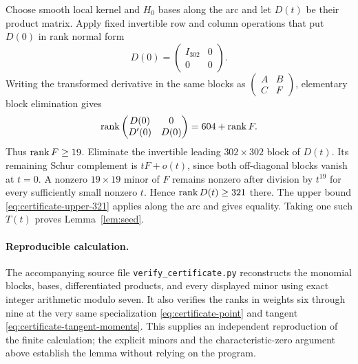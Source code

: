 Choose smooth local kernel and $H_0$ bases along the arc and let
$D(t)$ be their product matrix.  Apply fixed invertible row and
column operations that put $D(0)$ in rank normal form
\[
 D(0)=\begin{pmatrix}I_{302}&0\\0&0\end{pmatrix}.
\]
Writing the transformed derivative in the same blocks as
$\left(\begin{smallmatrix}A&B\\C&F\end{smallmatrix}\right)$,
elementary block elimination gives
\[
 \operatorname{rank}\begin{pmatrix}D(0)&0\\D'(0)&D(0)\end{pmatrix}
 =604+\operatorname{rank} F.
\]
Thus $\operatorname{rank} F\ge19$.  Eliminate the invertible leading
$302\times302$ block of $D(t)$.  Its remaining Schur complement
is $tF+o(t)$, since both off-diagonal blocks vanish at $t=0$.
A nonzero $19\times19$ minor of $F$ remains nonzero after division
by $t^{19}$ for every sufficiently small nonzero $t$.  Hence
$\operatorname{rank} D(t)\ge321$ there.  The upper bound
\eqref{eq:certificate-upper-321} applies along the arc and gives
equality.  Taking one such $T(t)$ proves Lemma~\ref{lem:seed}.

\paragraph{Reproducible calculation.}
The accompanying source file \texttt{verify\_certificate.py}
reconstructs the monomial blocks, bases, differentiated products,
and every displayed minor using exact integer arithmetic modulo
seven.  It also verifies the ranks in weights six through nine
at the very same specialization
\eqref{eq:certificate-point} and tangent
\eqref{eq:certificate-tangent-moments}.  This supplies an
independent reproduction of the finite calculation; the explicit
minors and the characteristic-zero argument above establish the
lemma without relying on the program.
